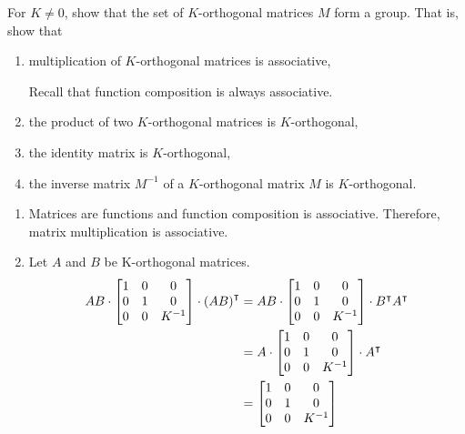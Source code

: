 \documentclass{ximera}
\begin{document}
\begin{problem}
For $K\neq0$, show that the set of $K$-orthogonal matrices $M$ form a
group.  That is, show that
\begin{enumerate}
\item multiplication of $K$-orthogonal matrices is associative, 
	\begin{hint}
	Recall that function composition is always associative.
	\end{hint}
\item the product of two $K$-orthogonal matrices is $K$-orthogonal,
\item the identity matrix is $K$-orthogonal,
\item the inverse matrix $M^{-1}$ of a $K$-orthogonal matrix $M$ is $K$-orthogonal.
\end{enumerate}

\begin{freeResponse}
\begin{enumerate}
\item Matrices are functions and function composition is associative. Therefore, matrix multiplication is associative.

\item Let $A$ and $B$ be K-orthogonal matrices. 
\begin{align*}
AB \cdot \begin{bmatrix}
1 & 0 & 0\\
0 & 1 & 0\\
0 & 0 & K^{-1}%
\end{bmatrix} \cdot
\left(AB\right)^\transpose
&= AB \cdot \begin{bmatrix}
1 & 0 & 0\\
0 & 1 & 0\\
0 & 0 & K^{-1}%
\end{bmatrix} \cdot
B^\transpose A^\transpose \\
&=A \cdot \begin{bmatrix}
1 & 0 & 0\\
0 & 1 & 0\\
0 & 0 & K^{-1}%
\end{bmatrix} \cdot
A^\transpose \\
&= \begin{bmatrix}
1 & 0 & 0\\
0 & 1 & 0\\
0 & 0 & K^{-1}%
\end{bmatrix}
\end{align*}


\end{enumerate}
\end{freeResponse}
\end{problem}
\end{document}
